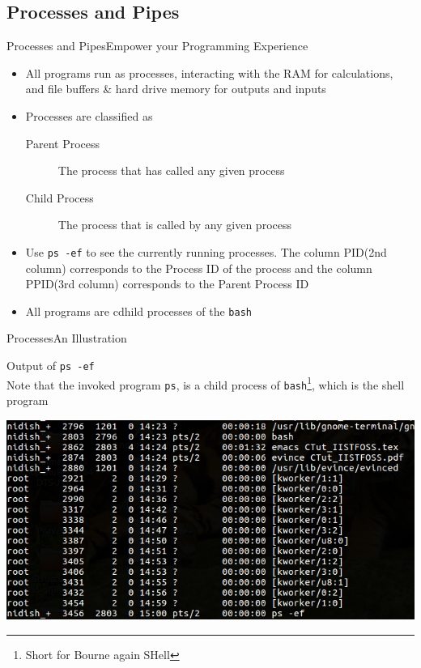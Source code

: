 \documentclass{beamer}
\begin{document}
\subsection{Processes and Pipes}
\begin{frame}[fragile]{Processes and Pipes}{Empower your Programming Experience}
  \begin{itemize}
  \item All programs run as processes, interacting with the RAM for
    calculations, and file buffers \& hard drive memory for outputs
    and inputs
  \item Processes are classified as
    \begin{description}
    \item[Parent Process] The process that has called any given
      process
    \item[Child Process] The process that is called by any given
      process
    \end{description}
  \item Use \verb|ps -ef| to see the currently running processes. The
    column PID(2nd column) corresponds to the Process ID of the
    process and the column PPID(3rd column) corresponds to the Parent
    Process ID
  \item All programs are cdhild processes of the \verb|bash|
  \end{itemize}
\end{frame}

\begin{frame}[fragile]{Processes}{An Illustration}
  \begin{center}
    Output of \verb|ps -ef|\\
    Note that the invoked program \verb|ps|, is a child process of
    \verb|bash|\footnote{Short for Bourne again SHell}, which is the
    shell program
  \end{center}
  \includegraphics[width=\textwidth]{Processes.png}
\end{frame}
\end{document}
